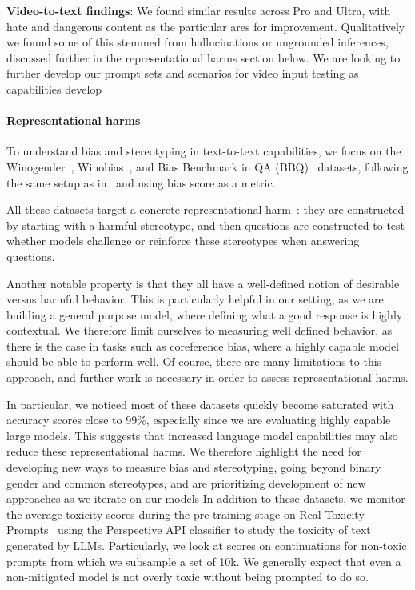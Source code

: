 \textbf{Video-to-text findings}: We found similar results across Pro and Ultra, with hate and dangerous content as the particular ares for improvement. Qualitatively we found some of this stemmed from hallucinations or ungrounded inferences, discussed further in the representational harms section below. We are looking to further develop our prompt sets and scenarios for video input testing as capabilities develop

\paragraph{Representational harms}

To understand bias and stereotyping in text-to-text capabilities, we focus on the Winogender~\citep{rudinger2018gender}, Winobias~\citep{zhao2018gender}, and Bias Benchmark in QA (BBQ)~\citep{parrish-2021-bbq} datasets, following the same setup as in~\citet{glaese2022improving} and using bias score as a metric.

All these datasets target a concrete representational harm~\citep{blodgett-etal-2021-stereotyping}: they are constructed by starting with a harmful stereotype, and then questions are constructed to test whether models challenge or reinforce these stereotypes when answering questions. 

Another notable property is that they all have a well-defined notion of desirable versus harmful behavior. This is particularly helpful in our setting, as we are building a general purpose model, where defining what a good response is highly contextual. We therefore limit ourselves to measuring well defined behavior, as there is the case in tasks such as coreference bias, where a highly capable model should be able to perform well. Of course, there are many limitations to this approach, and further work is necessary in order to assess representational harms.

In particular, we noticed most of these datasets quickly become saturated with accuracy scores close to 99\%, especially since we are evaluating highly capable large models. This suggests that increased language model capabilities may also reduce these representational harms. We therefore highlight the need for developing new ways to measure bias and stereotyping, going beyond binary gender and common stereotypes, and are prioritizing development of new approaches as we iterate on our models In addition to these datasets, we monitor the average toxicity scores during the pre-training stage on Real Toxicity Prompts~\citep{gehman2020realtoxicityprompts} using the Perspective API classifier to study the toxicity of text generated by LLMs. Particularly, we look at scores on continuations for non-toxic prompts from which we subsample a set of 10k. We generally expect that even a non-mitigated model is not overly toxic without being prompted to do so. 

